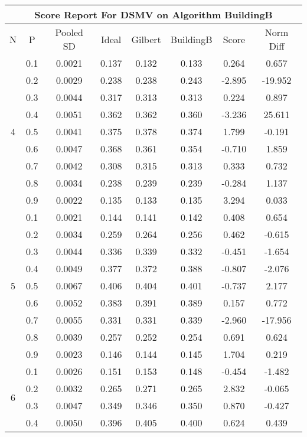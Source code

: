 \documentclass[11pt,a4paper]{report}
\begin{document}
\begin{longtable}{ | c | c || c | c | c | c | c | c | }
\hline
\multicolumn{8}{|c|}{ Score Report For DSMV on Algorithm BuildingB} \\
\hline
N & P & Pooled SD &  Ideal &  Gilbert & BuildingB  & Score & Norm Diff \\
 \hline
 \hline
 \endhead
\multirow{9}{*}{4} & 0.1 & 0.0021 & 0.137 & 0.132 & 0.133 & 0.264 & 0.657 \\
 & 0.2 & 0.0029 & 0.238 & 0.238 & 0.243 & -2.895 & -19.952 \\
 & 0.3 & 0.0044 & 0.317 & 0.313 & 0.313 & 0.224 & 0.897 \\
 & 0.4 & 0.0051 & 0.362 & 0.362 & 0.360 & -3.236 & 25.611 \\
 & 0.5 & 0.0041 & 0.375 & 0.378 & 0.374 & 1.799 & -0.191 \\
 & 0.6 & 0.0047 & 0.368 & 0.361 & 0.354 & -0.710 & 1.859 \\
 & 0.7 & 0.0042 & 0.308 & 0.315 & 0.313 & 0.333 & 0.732 \\
 & 0.8 & 0.0034 & 0.238 & 0.239 & 0.239 & -0.284 & 1.137 \\
 & 0.9 & 0.0022 & 0.135 & 0.133 & 0.135 & 3.294 & 0.033 \\
 \hline
\multirow{9}{*}{5} & 0.1 & 0.0021 & 0.144 & 0.141 & 0.142 & 0.408 & 0.654 \\
 & 0.2 & 0.0034 & 0.259 & 0.264 & 0.256 & 0.462 & -0.615 \\
 & 0.3 & 0.0044 & 0.336 & 0.339 & 0.332 & -0.451 & -1.654 \\
 & 0.4 & 0.0049 & 0.377 & 0.372 & 0.388 & -0.807 & -2.076 \\
 & 0.5 & 0.0067 & 0.406 & 0.404 & 0.401 & -0.737 & 2.177 \\
 & 0.6 & 0.0052 & 0.383 & 0.391 & 0.389 & 0.157 & 0.772 \\
 & 0.7 & 0.0055 & 0.331 & 0.331 & 0.339 & -2.960 & -17.956 \\
 & 0.8 & 0.0039 & 0.257 & 0.252 & 0.254 & 0.691 & 0.624 \\
 & 0.9 & 0.0023 & 0.146 & 0.144 & 0.145 & 1.704 & 0.219 \\
 \hline
\multirow{9}{*}{6} & 0.1 & 0.0026 & 0.151 & 0.153 & 0.148 & -0.454 & -1.482 \\
 & 0.2 & 0.0032 & 0.265 & 0.271 & 0.265 & 2.832 & -0.065 \\
 & 0.3 & 0.0047 & 0.349 & 0.346 & 0.350 & 0.870 & -0.427 \\
 & 0.4 & 0.0050 & 0.396 & 0.405 & 0.400 & 0.624 & 0.439 \\

\end{longtable}
\end{document}
